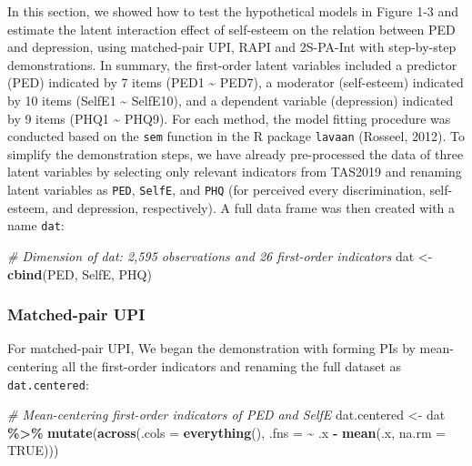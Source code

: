 \documentclass[
  man]{apa7}
\newenvironment{Shaded}{\begin{snugshade}}{\end{snugshade}}
\newcommand{\AttributeTok}[1]{\textcolor[rgb]{0.13,0.29,0.53}{#1}}
\newcommand{\CommentTok}[1]{\textcolor[rgb]{0.56,0.35,0.01}{\textit{#1}}}
\newcommand{\ConstantTok}[1]{\textcolor[rgb]{0.56,0.35,0.01}{#1}}
\newcommand{\FunctionTok}[1]{\textcolor[rgb]{0.13,0.29,0.53}{\textbf{#1}}}
\newcommand{\NormalTok}[1]{#1}
\newcommand{\OtherTok}[1]{\textcolor[rgb]{0.56,0.35,0.01}{#1}}
\newcommand{\SpecialCharTok}[1]{\textcolor[rgb]{0.81,0.36,0.00}{\textbf{#1}}}
\begin{document}
In this section, we showed how to test the hypothetical models in Figure 1-3 and estimate the latent interaction effect of self-esteem on the relation between PED and depression, using matched-pair UPI, RAPI and 2S-PA-Int with step-by-step demonstrations. In summary, the first-order latent variables included a predictor (PED) indicated by 7 items (PED1 \textasciitilde{} PED7), a moderator (self-esteem) indicated by 10 items (SelfE1 \textasciitilde{} SelfE10), and a dependent variable (depression) indicated by 9 items (PHQ1 \textasciitilde{} PHQ9). For each method, the model fitting procedure was conducted based on the \texttt{sem} function in the R package \texttt{lavaan} (Rosseel, 2012). To simplify the demonstration steps, we have already pre-processed the data of three latent variables by selecting only relevant indicators from TAS2019 and renaming latent variables as \texttt{PED}, \texttt{SelfE}, and \texttt{PHQ} (for perceived every discrimination, self-esteem, and depression, respectively). A full data frame was then created with a name \texttt{dat}:

\begin{Shaded}
\begin{Highlighting}[]
\CommentTok{\# Dimension of dat: 2,595 observations and 26 first{-}order indicators}
\NormalTok{dat }\OtherTok{\textless{}{-}} \FunctionTok{cbind}\NormalTok{(PED, SelfE, PHQ)}
\end{Highlighting}
\end{Shaded}

\hypertarget{matched-pair-upi}{%
\subsubsection{Matched-pair UPI}\label{matched-pair-upi}}

For matched-pair UPI, We began the demonstration with forming PIs by mean-centering all the first-order indicators and renaming the full dataset as \texttt{dat.centered}:

\begin{Shaded}
\begin{Highlighting}[]
\CommentTok{\# Mean{-}centering first{-}order indicators of PED and SelfE}
\NormalTok{dat.centered }\OtherTok{\textless{}{-}}\NormalTok{ dat }\SpecialCharTok{\%\textgreater{}\%}
       \FunctionTok{mutate}\NormalTok{(}\FunctionTok{across}\NormalTok{(}\AttributeTok{.cols =} \FunctionTok{everything}\NormalTok{(), }
                     \AttributeTok{.fns =} \SpecialCharTok{\textasciitilde{}}\NormalTok{ .x }\SpecialCharTok{{-}} \FunctionTok{mean}\NormalTok{(.x, }\AttributeTok{na.rm =} \ConstantTok{TRUE}\NormalTok{)))}
\end{Highlighting}
\end{Shaded}
\end{document}
